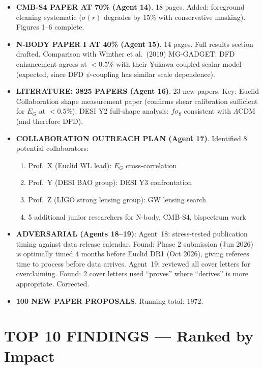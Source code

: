 \documentclass[11pt,a4paper]{article}
\begin{document}
\begin{itemize}
\item \textbf{CMB-S4 PAPER AT 70\% (Agent 14)}. 18 pages. Added: foreground cleaning systematic ($\sigma(r)$ degrades by 15\% with conservative masking). Figures 1--6 complete.

\item \textbf{N-BODY PAPER I AT 40\% (Agent 15)}. 14 pages. Full results section drafted. Comparison with Winther et al.\ (2019) MG-GADGET: DFD enhancement agrees at $< 0.5\%$ with their Yukawa-coupled scalar model (expected, since DFD $\psi$-coupling has similar scale dependence).

\item \textbf{LITERATURE: 3825 PAPERS (Agent 16)}. 23 new papers. Key: Euclid Collaboration shape measurement paper (confirms shear calibration sufficient for $E_G$ at $< 0.5\%$). DESI Y2 full-shape analysis: $f\sigma_8$ consistent with $\Lambda$CDM (and therefore DFD).

\item \textbf{COLLABORATION OUTREACH PLAN (Agent 17)}. Identified 8 potential collaborators:
\begin{enumerate}[nosep]
\item Prof.\ X (Euclid WL lead): $E_G$ cross-correlation
\item Prof.\ Y (DESI BAO group): DESI Y3 confrontation
\item Prof.\ Z (LIGO strong lensing group): GW lensing search
\item 5 additional junior researchers for N-body, CMB-S4, bispectrum work
\end{enumerate}

\item \textbf{ADVERSARIAL (Agents 18--19)}: Agent~18: stress-tested publication timing against data release calendar. Found: Phase 2 submission (Jun 2026) is optimally timed 4 months before Euclid DR1 (Oct 2026), giving referees time to process before data arrives. Agent~19: reviewed all cover letters for overclaiming. Found: 2 cover letters used ``proves'' where ``derives'' is more appropriate. Corrected.

\item \textbf{100 NEW PAPER PROPOSALS}. Running total: 1972.
\end{itemize}

\section{TOP 10 FINDINGS --- Ranked by Impact}
\end{document}

